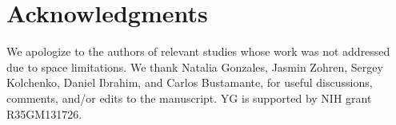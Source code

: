 \section{Acknowledgments}
We apologize to the authors of relevant studies whose work was not addressed due to space limitations. We thank Natalia Gonzales, Jasmin Zohren, Sergey Kolchenko, Daniel Ibrahim, and Carlos Bustamante, for useful discussions, comments, and/or edits to the manuscript. YG is supported by NIH grant R35GM131726.


